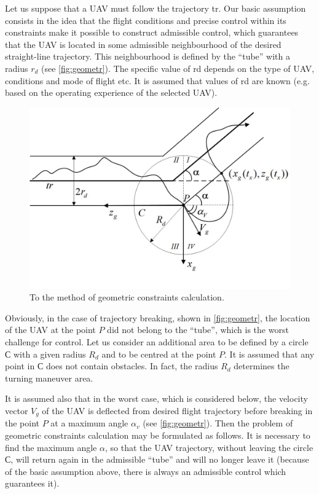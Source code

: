 \documentclass[review]{elsarticle}
\begin{document}
Let us suppose that a UAV must follow the trajectory tr. Our basic assumption consists in the idea that the flight conditions and precise control within its constraints make it possible to construct admissible control, which guarantees that the UAV is located in some admissible neighbourhood of the desired straight-line trajectory. This neighbourhood is defined by the ``tube'' with a radius $r_d$ (see \autoref{fig:geometr}). The specific value of rd depends on the type of UAV, conditions and mode of flight etc. It is assumed that values of rd are known (e.g. based on the operating experience of the selected UAV).

\begin{figure}[h]
	\centering
		\includegraphics[width=\textwidth]{ang_plan.jpg}
	\caption{To the method of geometric constraints calculation.}
	\label{fig:geometr}	
\end{figure}

Obviously, in the case of trajectory breaking, shown in \autoref{fig:geometr}, the location of the UAV at the point $P$ did not belong to the ``tube'', which is the worst challenge for control. Let us consider an additional area to be defined by a circle $С$ with a given radius $R_d$ and to be centred at the point $P$. It is assumed that any point in $С$ does not contain obstacles. In fact, the radius $R_d$ determines the turning maneuver area. 

It is assumed also that in the worst case, which is considered below, the velocity vector $V_g$ of the UAV is deflected from desired flight trajectory before breaking in the point $P$ at a maximum angle $\alpha_v$ (see \autoref{fig:geometr}). Then the problem of geometric constraints calculation may be formulated as follows. It is necessary to find the maximum angle $\alpha$, so that the UAV trajectory, without leaving the circle $С$, will return again in the admissible ``tube'' and will no longer leave it (because of the basic assumption above, there is always an admissible control which guarantees it).
\end{document}

